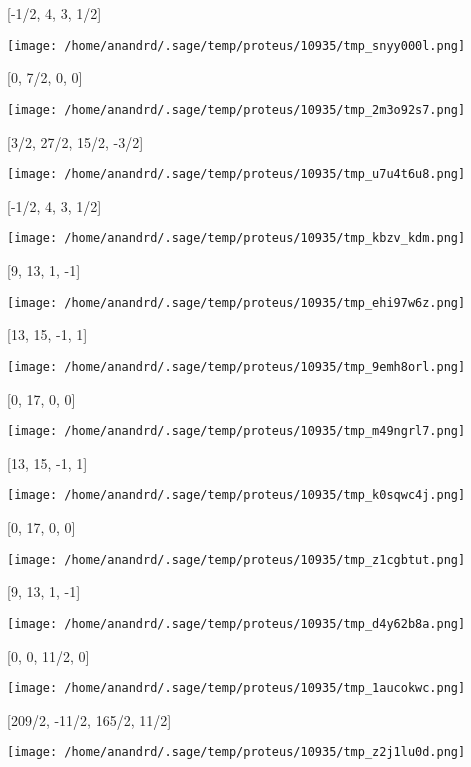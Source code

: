 \documentclass[11pt]{article}
\begin{document}
[-1/2, 4, 3, 1/2]
\begin{center}
\texttt{[image: /home/anandrd/.sage/temp/proteus/10935/tmp\_snyy000l.png]}
\end{center}
[0, 7/2, 0, 0]
\begin{center}
\texttt{[image: /home/anandrd/.sage/temp/proteus/10935/tmp\_2m3o92s7.png]}
\end{center}
[3/2, 27/2, 15/2, -3/2]
\begin{center}
\texttt{[image: /home/anandrd/.sage/temp/proteus/10935/tmp\_u7u4t6u8.png]}
\end{center}
[-1/2, 4, 3, 1/2]
\begin{center}
\texttt{[image: /home/anandrd/.sage/temp/proteus/10935/tmp\_kbzv\_kdm.png]}
\end{center}
[9, 13, 1, -1]
\begin{center}
\texttt{[image: /home/anandrd/.sage/temp/proteus/10935/tmp\_ehi97w6z.png]}
\end{center}
[13, 15, -1, 1]
\begin{center}
\texttt{[image: /home/anandrd/.sage/temp/proteus/10935/tmp\_9emh8orl.png]}
\end{center}
[0, 17, 0, 0]
\begin{center}
\texttt{[image: /home/anandrd/.sage/temp/proteus/10935/tmp\_m49ngrl7.png]}
\end{center}
[13, 15, -1, 1]
\begin{center}
\texttt{[image: /home/anandrd/.sage/temp/proteus/10935/tmp\_k0sqwc4j.png]}
\end{center}
[0, 17, 0, 0]
\begin{center}
\texttt{[image: /home/anandrd/.sage/temp/proteus/10935/tmp\_z1cgbtut.png]}
\end{center}
[9, 13, 1, -1]
\begin{center}
\texttt{[image: /home/anandrd/.sage/temp/proteus/10935/tmp\_d4y62b8a.png]}
\end{center}
[0, 0, 11/2, 0]
\begin{center}
\texttt{[image: /home/anandrd/.sage/temp/proteus/10935/tmp\_1aucokwc.png]}
\end{center}
[209/2, -11/2, 165/2, 11/2]
\begin{center}
\texttt{[image: /home/anandrd/.sage/temp/proteus/10935/tmp\_z2j1lu0d.png]}
\end{center}
\end{document}
